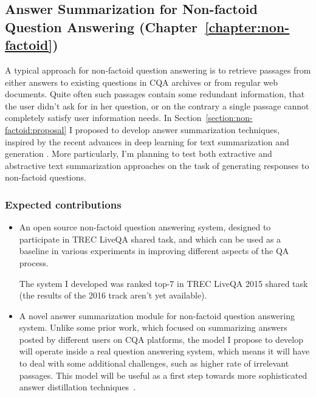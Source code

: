 \subsection{Answer Summarization for Non-factoid Question Answering (Chapter~\ref{chapter:non-factoid})}
\label{section:proposal:plan:non-factoid}

A typical approach for non-factoid question answering is to retrieve passages from either answers to existing questions in CQA archives or from regular web documents.
Quite often such passages contain some redundant information, that the user didn't ask for in her question, or on the contrary a single passage cannot completely satisfy user information needs.
In Section~\ref{section:non-factoid:proposal} I proposed to develop answer summarization techniques, inspired by the recent advances in deep learning for text summarization \cite{rush-chopra-weston:2015:EMNLP,chopraabstractive16} and generation \cite{karpathy2015deep}.
More particularly, I'm planning to test both extractive and abstractive text summarization approaches on the task of generating responses to non-factoid questions.

\subsubsection{Expected contributions}
\label{section:proposal:plan:non-factoid:contributions}

\begin{itemize}
\item An open source non-factoid question answering system, designed to participate in TREC LiveQA shared task, and which can be used as a baseline in various experiments in improving different aspects of the QA process.

The system I developed was ranked top-7 in TREC LiveQA 2015 shared task (the results of the 2016 track aren't yet available).

\item A novel answer summarization module for non-factoid question answering system.
Unlike some prior work, which focused on summarizing answers posted by different users on CQA platforms, the model I propose to develop will operate inside a real question answering system, which means it will have to deal with some additional challenges, such as higher rate of irrelevant passages.
This model will be useful as a first step towards more sophisticated answer distillation techniques~\cite{mitra2016distillation}.

\end{itemize}


